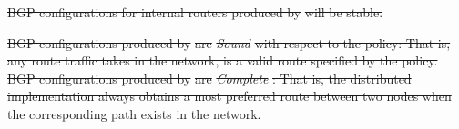 \documentclass{sig-alternate-10pt}
\newcommand{\sysname}{{\small \sf Propane}\xspace}
\providecommand{\DIFdel}[1]{{\protect\color{red}\sout{#1}}}                      %
\providecommand{\DIFdelbegin}{} %
\providecommand{\DIFdelend}{} %
\begin{document}
\DIFdelend %
\DIFdelbegin %

\DIFdel{BGP configurations for internal routers produced by }%
\DIFdel{will be stable. 
}%

\DIFdel{BGP configurations produced by }%
\DIFdel{are }\textit{\DIFdel{Sound}} %
\DIFdel{with respect to the policy: That is, any route traffic takes in the network, is a valid route specified by the policy.
}%
\DIFdelend %
%
\DIFdelbegin %
\DIFdel{BGP configurations produced by }%
\DIFdel{are }\textit{\DIFdel{Complete}}%
\DIFdel{: That is, the distributed implementation always obtains a most preferred route between two nodes when the corresponding path exists in the network.
}%
\DIFdelend %
\end{document}
